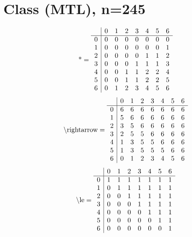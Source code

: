 \documentclass[11pt]{article}
\begin{document}
\section{Class (MTL), n=245}
\[\text{*} = 
\begin{array}{r | r r r r r r r}
 & 0 & 1 & 2 & 3 & 4 & 5 & 6 \\ \hline
0 & 0 & 0 & 0 & 0 & 0 & 0 & 0 \\
1 & 0 & 0 & 0 & 0 & 0 & 0 & 1 \\
2 & 0 & 0 & 0 & 0 & 1 & 1 & 2 \\
3 & 0 & 0 & 0 & 1 & 1 & 1 & 3 \\
4 & 0 & 0 & 1 & 1 & 2 & 2 & 4 \\
5 & 0 & 0 & 1 & 1 & 2 & 2 & 5 \\
6 & 0 & 1 & 2 & 3 & 4 & 5 & 6 \\
\end{array}
\]
\[\text{\textbackslash rightarrow} = 
\begin{array}{r | r r r r r r r}
 & 0 & 1 & 2 & 3 & 4 & 5 & 6 \\ \hline
0 & 6 & 6 & 6 & 6 & 6 & 6 & 6 \\
1 & 5 & 6 & 6 & 6 & 6 & 6 & 6 \\
2 & 3 & 5 & 6 & 6 & 6 & 6 & 6 \\
3 & 2 & 5 & 5 & 6 & 6 & 6 & 6 \\
4 & 1 & 3 & 5 & 5 & 6 & 6 & 6 \\
5 & 1 & 3 & 5 & 5 & 5 & 6 & 6 \\
6 & 0 & 1 & 2 & 3 & 4 & 5 & 6 \\
\end{array}
\]
\[\text{\textbackslash le} = 
\begin{array}{r | r r r r r r r}
 & 0 & 1 & 2 & 3 & 4 & 5 & 6 \\ \hline
0 & 1 & 1 & 1 & 1 & 1 & 1 & 1 \\
1 & 0 & 1 & 1 & 1 & 1 & 1 & 1 \\
2 & 0 & 0 & 1 & 1 & 1 & 1 & 1 \\
3 & 0 & 0 & 0 & 1 & 1 & 1 & 1 \\
4 & 0 & 0 & 0 & 0 & 1 & 1 & 1 \\
5 & 0 & 0 & 0 & 0 & 0 & 1 & 1 \\
6 & 0 & 0 & 0 & 0 & 0 & 0 & 1 \\
\end{array}
\]
\end{document}
